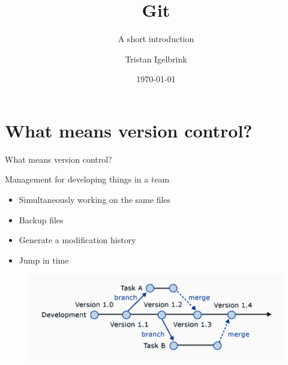 \documentclass[10pt]{beamer}
\title{Git}
\subtitle{A short introduction}
\date{\today}
\author{Tristan Igelbrink}
\institute{Hochschule Osnabrück}
\begin{document}
\maketitle


\section{What means version control?}

\begin{frame}[fragile]{What means version control?}
    \begin{alertblock}{Management for developing things in a team}
     \begin{itemize}
       \item Simultaneously working on the same files
       \item Backup files
       \item Generate a modification history
       \item Jump in time
      \end{itemize}
    \end{alertblock}
    \begin{figure}[t]
       \includegraphics[scale=0.6]{version_control_alpha.png} 
    \end{figure}
\end{frame}
\end{document}
